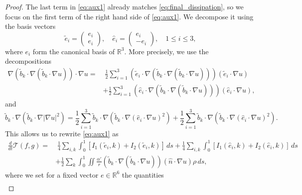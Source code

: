 \documentclass[11pt]{amsart}
\numberwithin{equation}{section}
\begin{document}
\begin{proof}
The last term in \eqref{eq:aux1} already matches \eqref{eq:final_dissipation}, so we focus on the first term of the right hand side of \eqref{eq:aux1}. We decompose it using the basis vectors 
%
\begin{equation*}
  \tilde{e}_{i}=\begin{pmatrix}e_{i}\\e_{i}\end{pmatrix}, \quad
  \hat{e}_{i}=\begin{pmatrix}e_{i}\\-e_{i}\end{pmatrix},\quad 1\leq i \leq 3,
\end{equation*}
%
where $e_i$ form the canonical basis of $\mathbb{R}^3$. More precisely, we use the decompositions
%
\begin{align*}
  \nabla\left(\tilde{b}_{k}\cdot\nabla\left(\tilde{b}_{k}\cdot\nabla u\right)\right)\cdot\nabla u
  = & \; \frac{1}{2}\sum_{i=1}^{3}\left(\tilde{e}_{i}\cdot\nabla\left(\tilde{b}_{k}\cdot\nabla\left(\tilde{b}_{k}\cdot\nabla u\right)\right)\right)\left(\tilde{e}_{i}\cdot\nabla u\right)	\\
  & +\frac{1}{2}\sum_{i=1}^{3}\left(\hat{e}_{i}\cdot\nabla\left(\tilde{b}_{k}\cdot\nabla\left(\tilde{b}_{k}\cdot\nabla u\right)\right)\right)\left(\hat{e}_{i}\cdot\nabla u\right),
\end{align*}
%
and
%
\begin{equation*}
  \tilde{b}_{k}\cdot\nabla\left(\tilde{b}_{k}\cdot\nabla\left|\nabla u\right|^{2}\right)=\frac{1}{2}\sum_{i=1}^{3}\tilde{b}_{k}\cdot\nabla\left(\tilde{b}_{k}\cdot\nabla\left(\hat{e}_{i}\cdot\nabla u\right)^{2}\right)+\frac{1}{2}\sum_{i=1}^{3}\tilde{b}_{k}\cdot\nabla\left(\tilde{b}_{k}\cdot\nabla\left(\hat{e}_{i}\cdot\nabla u\right)^{2}\right).
\end{equation*}
%
This allows us to rewrite \eqref{eq:aux1} as
% 
\begin{align}
  \label{eq:decomp_I1_I2}
  \frac{d}{dt}\mathcal{T}(f,g)
  =& \; \frac{1}{4}\sum_{i,k}\int_0^1\left[I_{1}(\tilde{e}_{i},k)+I_{2}(\tilde{e}_{i},k)\right]\, ds
  +\frac{1}{4}\sum_{i,k}\int_0^1\left[I_{1}(\hat{e}_{i},k)+I_{2}(\hat{e}_{i},k)\right]\,ds	\\
  & +\frac{1}{2}\sum_{k}\int_0^1\iint\frac{\alpha'}{r}\left(\tilde{b}_{k}\cdot\nabla\left(\tilde{b}_{k}\cdot\nabla u\right)\right)\left(\hat{n}\cdot\nabla u\right)\rho\,ds,
  \nonumber
\end{align}
where we set for a fixed vector $e\in \mathbb{R}^6$ the quantities
% 
\begin{align*}

\end{align*}
\end{proof}
\end{document}
